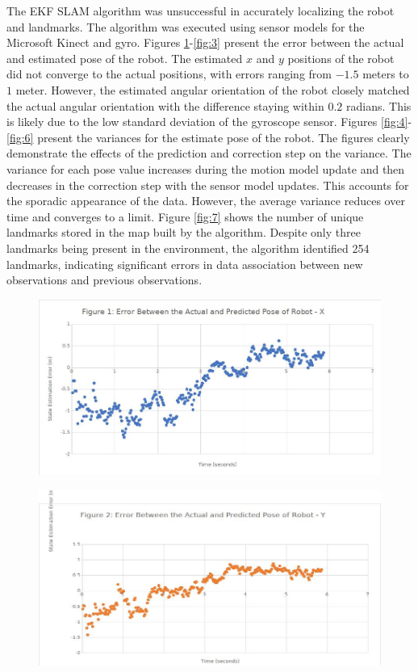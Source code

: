 \documentclass[journal]{IEEEtran}
\begin{document}
The EKF SLAM algorithm was unsuccessful in accurately localizing the robot and landmarks. The 
algorithm was executed using sensor models for the Microsoft Kinect and gyro. Figures \ref{fig:1}-\ref{fig:3}
present the error between the actual and estimated pose of the robot. The estimated $x$ and $y$ positions of the 
robot did not converge to the actual positions, with errors ranging from $-1.5$ meters to $1$ meter. However, 
the estimated angular orientation of the robot closely matched the actual angular orientation with the 
difference staying within $0.2$ radians. This is likely due to the low standard deviation of the gyroscope sensor. 
Figures \ref{fig:4}-\ref{fig:6} present the variances for the estimate pose of the robot. The figures clearly demonstrate 
the effects of the prediction and correction step on the variance. The variance for each pose value 
increases during the motion model update and then decreases in the correction step with the sensor 
model updates. This accounts for the sporadic appearance of the data. However, the average variance 
reduces over time and converges to a limit. Figure \ref{fig:7} shows the number of unique landmarks stored in the 
map built by the algorithm. Despite only three landmarks being present in the environment, the algorithm 
identified 254 landmarks, indicating significant errors in data association between new observations and 
previous observations.

\begin{figure}[!t]%
\centering
\includegraphics[width=0.9\linewidth]{Figures/1-actual-predicted-error-x.jpg}
\caption{}
\label{fig:1}
\end{figure}

\begin{figure}[!t]%
\centering
\includegraphics[width=0.9\linewidth]{Figures/2-actual-predicted-error-y.jpg}
\caption{}
\label{fig:2}
\end{figure}
\end{document}
